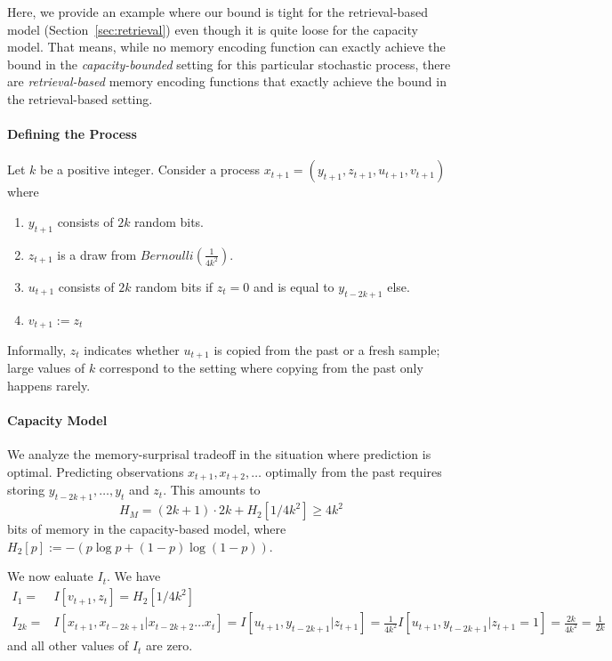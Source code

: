 \documentclass[11pt,letterpaper]{article}
\begin{document}
Here, we provide an example where our bound is tight for the retrieval-based model (Section~\ref{sec:retrieval}) even though it is quite loose for the capacity model.
That means, while no memory encoding function can exactly achieve the bound in the \emph{capacity-bounded} setting for this particular stochastic process, there are \emph{retrieval-based} memory encoding functions that exactly achieve the bound in the retrieval-based setting.

\paragraph{Defining the Process}
Let $k$ be a positive integer.
Consider a process $x_{t+1} = (y_{t+1}, z_{t+1}, u_{t+1}, v_{t+1})$ where
\begin{enumerate}
    \item $y_{t+1}$ consists of $2k$ random bits.
    \item $z_{t+1}$ is a draw from $Bernoulli(\frac{1}{4k^2})$.
    \item $u_{t+1}$ consists of $2k$ random bits if $z_t = 0$ and is equal to $y_{t-2k+1}$ else.
    \item $v_{t+1} := z_t$ 
\end{enumerate}
Informally, $z_t$ indicates whether $u_{t+1}$ is copied from the past or a fresh sample; large values of $k$ correspond to the setting where copying from the past only happens rarely.

\paragraph{Capacity Model}
We analyze the memory-surprisal tradeoff in the situation where prediction is optimal.
Predicting observations $x_{t+1}, x_{t+2}, \dots$ optimally from the past requires storing $y_{t-2k+1}, \dots, y_{t}$ and $z_t$.
This amounts to
\begin{equation}
    H_M = (2k+1)\cdot 2k + H_2[1/4k^2] \geq 4k^2
\end{equation} 
bits of memory in the capacity-based model, where $H_2[p] := -(p\log p + (1-p) \log (1-p))$.

We now ealuate $I_t$. We have
\begin{align}
I_1 =& I[v_{t+1}, z_t] = H_2[1/4k^2] \\
   I_{2k} =& I[x_{t+1}, x_{t-2k+1}|x_{t-2k+2}\dots x_t] = I[u_{t+1}, y_{t-2k+1}|z_{t+1}] = \frac{1}{4k^2} I[u_{t+1}, y_{t-2k+1}|z_{t+1}=1] = \frac{2k}{4k^2} = \frac{1}{2k} 
\end{align}
and all other values of $I_t$ are zero.
\end{document}
